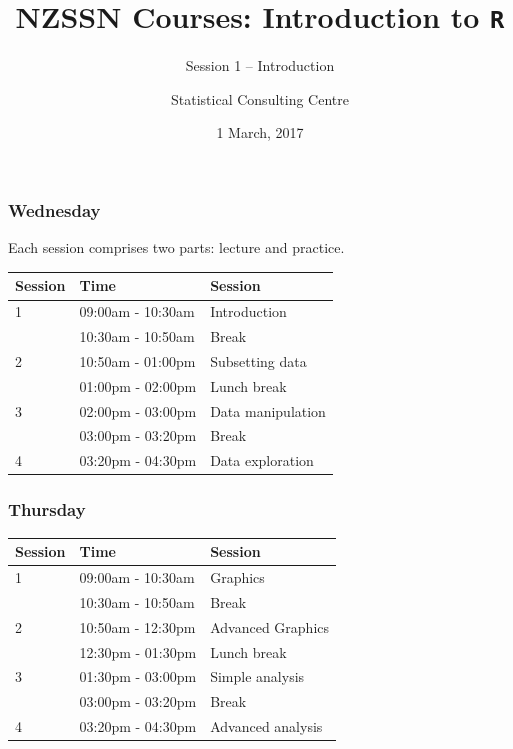 \documentclass[handout]{beamer}\usepackage[]{graphicx}\usepackage[]{color}
\author[SCC]{Statistical Consulting Centre}%
\institute[\href{mailto:consulting@stat.auckland.ac.nz}
  {consulting@stat.auckland.ac.nz}]{\href{mailto:consulting@stat.auckland.ac.nz}
  {consulting@stat.auckland.ac.nz}\\
The Department of Statistics\\
The University of Auckland}
\title[Session 1 -- Introduction]{NZSSN Courses: Introduction to \texttt{R}}
\subtitle{Session 1 -- Introduction}
\date{1 March, 2017}
\begin{document}


\maketitle

\begin{frame}
  \frametitle{Wednesday}

\begin{center}
Each session comprises two parts: lecture and practice.
\end{center}
  \begin{table}[h]
    \centering
    \begin{tabular}[h]{lll}
     \hline
     \textbf{Session} & \textbf{Time}     & \textbf{Session}  \\
     \hline
     1            & 09:00am - 10:30am & Introduction          \\
                  & 10:30am - 10:50am & Break             \\
     2            & 10:50am - 01:00pm & Subsetting data \\
                  & 01:00pm - 02:00pm & Lunch break        \\
     3            & 02:00pm - 03:00pm & Data manipulation        \\
                  & 03:00pm - 03:20pm & Break             \\
     4            & 03:20pm - 04:30pm & Data exploration         \\
     \hline
    \end{tabular}
  \end{table}
\end{frame}

\begin{frame}
  \frametitle{Thursday}

  \begin{table}[h]
    \centering
    \begin{tabular}[h]{lll}
     \hline
     \textbf{Session} & \textbf{Time}     & \textbf{Session}  \\
     \hline
     1          & 09:00am - 10:30am & Graphics          \\
                & 10:30am - 10:50am & Break             \\
     2          & 10:50am - 12:30pm & Advanced Graphics \\
                & 12:30pm - 01:30pm & Lunch break        \\
     3          & 01:30pm - 03:00pm & Simple analysis        \\
                & 03:00pm - 03:20pm & Break             \\
     4          & 03:20pm - 04:30pm & Advanced analysis     \\
     \hline
    \end{tabular}
  \end{table}
\end{frame}
\end{document}
